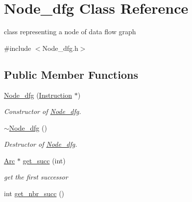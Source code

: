 \hypertarget{classNode__dfg}{
\section{Node\_\-dfg Class Reference}
\label{classNode__dfg}
}


class representing a node of data flow graph  


{\ttfamily \#include $<$Node\_\-dfg.h$>$}\subsection*{Public Member Functions}
\begin{DoxyCompactItemize}
\item 
\hypertarget{classNode__dfg_ac9b79961aaadf29eecd03b227b4c0875}{
\hyperlink{classNode__dfg_ac9b79961aaadf29eecd03b227b4c0875}{Node\_\-dfg} (\hyperlink{classInstruction}{Instruction} $\ast$)}
\label{classNode__dfg_ac9b79961aaadf29eecd03b227b4c0875}

\begin{DoxyCompactList}\small\item\em Constructor of \hyperlink{classNode__dfg}{Node\_\-dfg}. \item\end{DoxyCompactList}\item 
\hypertarget{classNode__dfg_a0a2a7c4634ad6802e7c69ab0d95957fa}{
\hyperlink{classNode__dfg_a0a2a7c4634ad6802e7c69ab0d95957fa}{$\sim$Node\_\-dfg} ()}
\label{classNode__dfg_a0a2a7c4634ad6802e7c69ab0d95957fa}

\begin{DoxyCompactList}\small\item\em Destructor of \hyperlink{classNode__dfg}{Node\_\-dfg}. \item\end{DoxyCompactList}\item 
\hypertarget{classNode__dfg_ad7344d9aa8b8bef5acd1625c2c277a8b}{
\hyperlink{structArc}{Arc} $\ast$ \hyperlink{classNode__dfg_ad7344d9aa8b8bef5acd1625c2c277a8b}{get\_\-succ} (int)}
\label{classNode__dfg_ad7344d9aa8b8bef5acd1625c2c277a8b}

\begin{DoxyCompactList}\small\item\em get the first successor \item\end{DoxyCompactList}\item 
\hypertarget{classNode__dfg_aa281cead75cafbfd28adefdad4aa4c45}{
int \hyperlink{classNode__dfg_aa281cead75cafbfd28adefdad4aa4c45}{get\_\-nbr\_\-succ} ()}
\label{classNode__dfg_aa281cead75cafbfd28adefdad4aa4c45}


\end{DoxyCompactItemize}
